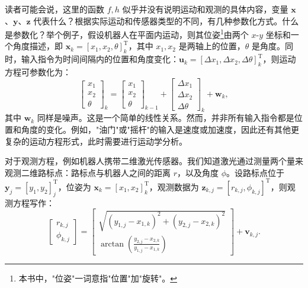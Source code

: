 读者可能会说，这里的函数 $f,h$ 似乎并没有说明运动和观测的具体内容，变量 $\mathbf{x}$、$\mathbf{y}$、$\mathbf{z}$ 代表什么？根据实际运动和传感器类型的不同，有几种参数化方式。什么是参数化？举个例子，假设机器人在平面内运动，则其位姿\footnote{本书中，"位姿"一词意指"位置"加"旋转"。}由两个 $x$-$y$ 坐标和一个角度描述，即 $\mathbf{x}_k = [x_1,x_2,\theta]_k^\mathrm{T}$，其中 $x_1, x_2$ 是两轴上的位置，$\theta$ 是角度。同时，输入指令为时间间隔内的位置和角度变化：$\mathbf{u}_k = [ \Delta x_1, \Delta x_2, \Delta \theta ]_k^\mathrm{T} $，则运动方程可参数化为：
\begin{equation}
{\left[ \begin{array}{l}
    x_1\\
    x_2\\
    \theta
    \end{array} \right]_k} = {\left[ \begin{array}{l}
    x_1\\
    x_2\\
    \theta
    \end{array} \right]_{k - 1}} + {\left[ \begin{array}{l}
    \Delta x_1\\
    \Delta x_2\\
    \Delta \theta
    \end{array} \right]_k} + {\mathbf{w}_k},
\end{equation}
其中 $\mathbf{w}_k$ 同样是噪声。这是一个简单的线性关系。然而，并非所有输入指令都是位置和角度的变化。例如，"油门"或"摇杆"的输入是速度或加速度，因此还有其他更复杂的运动方程形式，此时需要进行运动学分析。

对于观测方程，例如机器人携带二维激光传感器。我们知道激光通过测量两个量来观测二维路标点：路标点与机器人之间的距离 $r$，以及角度 $\phi$。设路标点位于 $\mathbf{y}_j = [y_1, y_2]_j^\mathrm{T}$，位姿为 $\mathbf{x}_k=[x_1,x_2]_k^\mathrm{T}$，观测数据为 $\mathbf{z}_{k,j} = [r_{k,j}, \phi_{k,j}]^\mathrm{T}$，则观测方程写作：
\begin{equation}
\left[ \begin{array}{l}
r_{k,j}\\
\phi_{k,j}
\end{array} \right] = \left[ \begin{array}{l}
\sqrt {{{\left(y_{1,j} - x_{1,k} \right)}^2} + {{\left( {{y_{2,j}} - x_{2,k} } \right)}^2}} \\
\arctan \left( \frac{{y_{2,j}} - x_{2,k}}{{y_{1,j} - x_{1,k}}} \right)
\end{array} \right] + \mathbf{v}_{k, j}.
\end{equation}

